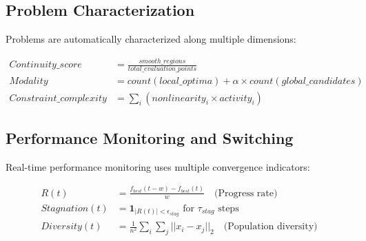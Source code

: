 \documentclass[12pt,a4paper]{article}
\begin{document}
\subsection{Problem Characterization}

Problems are automatically characterized along multiple dimensions:

\begin{align}
Continuity\_score &= \frac{smooth\_regions}{total\_evaluation\_points} \label{eq:continuity}\\
Modality &= count(local\_optima) + \alpha \times count(global\_candidates) \label{eq:modality}\\
Constraint\_complexity &= \sum_i (nonlinearity_i \times activity_i) \label{eq:constraint_complexity}
\end{align}

\begin{table}[H]
\centering
\caption{Algorithm Portfolio and Optimal Problem Types}
\label{tab:algorithm_portfolio}
\end{table}

\subsection{Performance Monitoring and Switching}

Real-time performance monitoring uses multiple convergence indicators:

\begin{align}
R(t) &= \frac{f_{best}(t-w) - f_{best}(t)}{w} \quad \text{(Progress rate)} \label{eq:progress_rate}\\
Stagnation(t) &= \mathbf{1}_{|R(t)| < \epsilon_{stag}} \text{ for } \tau_{stag} \text{ steps} \label{eq:stagnation}\\
Diversity(t) &= \frac{1}{n^2}\sum_i\sum_j ||x_i - x_j||_2 \quad \text{(Population diversity)} \label{eq:diversity}
\end{align}
\end{document}
